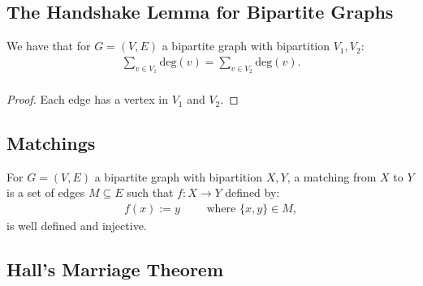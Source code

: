 \subsection{The Handshake Lemma for Bipartite Graphs}

We have that for $G = (V, E)$ a bipartite graph with bipartition
$V_1, V_2$: \begin{gather*}
  \sum_{v \in V_1} \text{deg}(v) = \sum_{v \in V_2} \text{deg}(v). \\
\end{gather*}
\begin{proof}
    Each edge has a vertex in $V_1$ and $V_2$.
\end{proof}

\subsection{Matchings}

For $G = (V, E)$ a bipartite graph with bipartition $X, Y$,
a matching from $X$ to $Y$ is a set of edges $M \subseteq E$
such that $f : X \to Y$ defined by: \begin{gather*}
  f(x) := y \qquad \text{ where } \{x, y\} \in M,
\end{gather*} is well defined and injective.

\subsection{Hall's Marriage Theorem} \label{halls}


